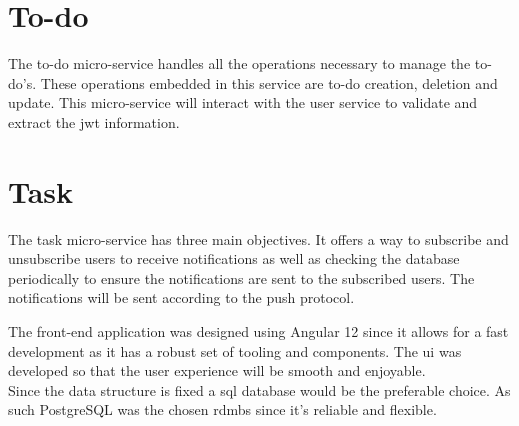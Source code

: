		\section{To-do}
		The to-do micro-service handles all the operations necessary to manage the to-do's. These operations embedded in this service are to-do creation, deletion and update.
		This micro-service will interact with the user service to validate and extract the \gls{jwt} information.
		
		\section{Task}
		The task micro-service has three main objectives. It offers a way to subscribe and unsubscribe users to receive notifications as well as checking the database periodically to ensure the notifications are sent to the subscribed users. The notifications will be sent according to the push protocol\cite{pushprotocol}.
	

	
		The front-end application was designed using Angular 12\cite{angular} since it allows for a fast development as it has a robust set of tooling and components. The \gls{ui} was developed so that the user experience will be smooth and enjoyable.\\
		Since the data structure is fixed a \gls{sql} database would be the preferable choice. As such PostgreSQL\cite{postgres} was the chosen \gls{rdmbs} since it's reliable and flexible.
	
	
		
	
	
	 